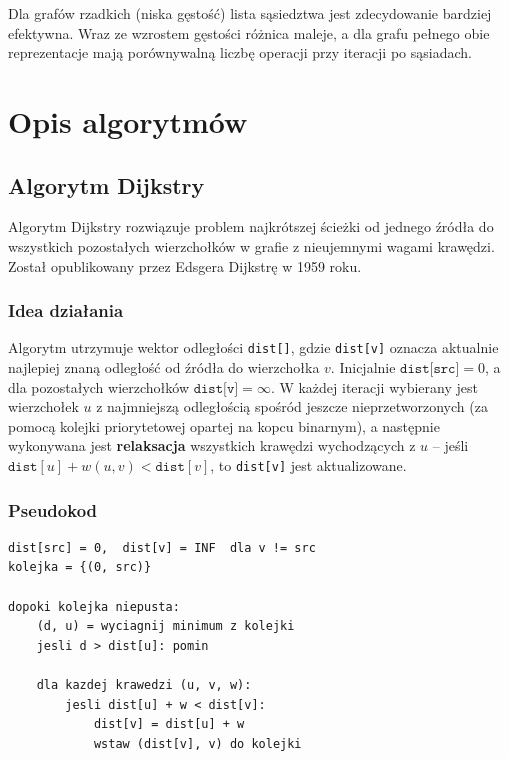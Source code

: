 \documentclass[12pt,a4paper]{article}
\begin{document}
Dla grafów rzadkich (niska gęstość) lista sąsiedztwa jest zdecydowanie
bardziej efektywna. Wraz ze wzrostem gęstości różnica maleje, a dla
grafu pełnego obie reprezentacje mają porównywalną liczbę operacji
przy iteracji po sąsiadach.
 
\section{Opis algorytmów}
 
\subsection{Algorytm Dijkstry}
 
Algorytm Dijkstry rozwiązuje problem najkrótszej ścieżki od jednego
źródła do wszystkich pozostałych wierzchołków w grafie z nieujemnymi
wagami krawędzi. Został opublikowany przez Edsgera Dijkstrę w 1959 roku.
 
\subsubsection*{Idea działania}
 
Algorytm utrzymuje wektor odległości \texttt{dist[]}, gdzie
\texttt{dist[v]} oznacza aktualnie najlepiej znaną odległość od źródła
do wierzchołka $v$. Inicjalnie $\texttt{dist[src]} = 0$, a dla
pozostałych wierzchołków $\texttt{dist[v]} = \infty$. W każdej iteracji
wybierany jest wierzchołek $u$ z najmniejszą odległością spośród
jeszcze nieprzetworzonych (za pomocą kolejki priorytetowej opartej
na kopcu binarnym), a następnie wykonywana jest \textbf{relaksacja}
wszystkich krawędzi wychodzących z $u$ -- jeśli
$\texttt{dist}[u] + w(u,v) < \texttt{dist}[v]$, to \texttt{dist[v]}
jest aktualizowane.
 
\subsubsection*{Pseudokod}
 
\begin{lstlisting}[style=cpp, caption={Pseudokod algorytmu Dijkstry}]
dist[src] = 0,  dist[v] = INF  dla v != src
kolejka = {(0, src)}
 
dopoki kolejka niepusta:
    (d, u) = wyciagnij minimum z kolejki
    jesli d > dist[u]: pomin
 
    dla kazdej krawedzi (u, v, w):
        jesli dist[u] + w < dist[v]:
            dist[v] = dist[u] + w
            wstaw (dist[v], v) do kolejki
\end{lstlisting}
 
\end{document}
